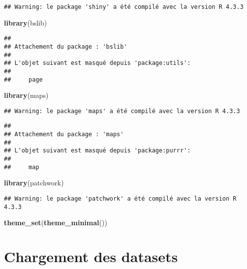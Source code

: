 \documentclass[
]{article}
\newenvironment{Shaded}{\begin{snugshade}}{\end{snugshade}}
\newcommand{\FunctionTok}[1]{\textcolor[rgb]{0.13,0.29,0.53}{\textbf{#1}}}
\newcommand{\NormalTok}[1]{#1}
\begin{document}
\begin{verbatim}
## Warning: le package 'shiny' a été compilé avec la version R 4.3.3
\end{verbatim}

\begin{Shaded}
\begin{Highlighting}[]
\FunctionTok{library}\NormalTok{(bslib)}
\end{Highlighting}
\end{Shaded}

\begin{verbatim}
## 
## Attachement du package : 'bslib'
## 
## L'objet suivant est masqué depuis 'package:utils':
## 
##     page
\end{verbatim}

\begin{Shaded}
\begin{Highlighting}[]
\FunctionTok{library}\NormalTok{(maps)}
\end{Highlighting}
\end{Shaded}

\begin{verbatim}
## Warning: le package 'maps' a été compilé avec la version R 4.3.3
\end{verbatim}

\begin{verbatim}
## 
## Attachement du package : 'maps'
## 
## L'objet suivant est masqué depuis 'package:purrr':
## 
##     map
\end{verbatim}

\begin{Shaded}
\begin{Highlighting}[]
\FunctionTok{library}\NormalTok{(patchwork)}
\end{Highlighting}
\end{Shaded}

\begin{verbatim}
## Warning: le package 'patchwork' a été compilé avec la version R 4.3.3
\end{verbatim}

\begin{Shaded}
\begin{Highlighting}[]
\FunctionTok{theme\_set}\NormalTok{(}\FunctionTok{theme\_minimal}\NormalTok{())}
\end{Highlighting}
\end{Shaded}

\hypertarget{chargement-des-datasets}{%
\section{Chargement des datasets}\label{chargement-des-datasets}}
\end{document}
